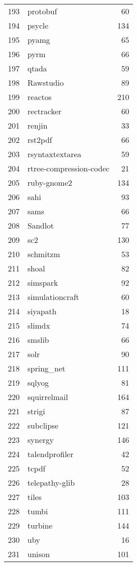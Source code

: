 \begin{table}[ht]
\begin{tabular}{rlr}
  193 & protobuf &  60 \\ 
  194 & psycle & 134 \\ 
  195 & pyamg &  65 \\ 
  196 & pyrm &  66 \\ 
  197 & qtada &  59 \\ 
  198 & Rawstudio &  89 \\ 
  199 & reactos & 210 \\ 
  200 & rectracker &  60 \\ 
  201 & renjin &  33 \\ 
  202 & rst2pdf &  66 \\ 
  203 & rsyntaxtextarea &  59 \\ 
  204 & rtree-compression-codec &  21 \\ 
  205 & ruby-gnome2 & 134 \\ 
  206 & sahi &  93 \\ 
  207 & sams &  66 \\ 
  208 & Sandlot &  77 \\ 
  209 & sc2 & 130 \\ 
  210 & schmitzm &  53 \\ 
  211 & shoal &  82 \\ 
  212 & simspark &  92 \\ 
  213 & simulationcraft &  60 \\ 
  214 & siyapath &  18 \\ 
  215 & slimdx &  74 \\ 
  216 & smslib &  66 \\ 
  217 & solr &  90 \\ 
  218 & spring\_net & 111 \\ 
  219 & sqlyog &  81 \\ 
  220 & squirrelmail & 164 \\ 
  221 & strigi &  87 \\ 
  222 & subclipse & 121 \\ 
  223 & synergy & 146 \\ 
  224 & talendprofiler &  42 \\ 
  225 & tcpdf &  52 \\ 
  226 & telepathy-glib &  28 \\ 
  227 & tiles & 103 \\ 
  228 & tumbi & 111 \\ 
  229 & turbine & 144 \\ 
  230 & uby &  16 \\ 
  231 & unison & 101 \\ 

\end{tabular}
\end{table}
